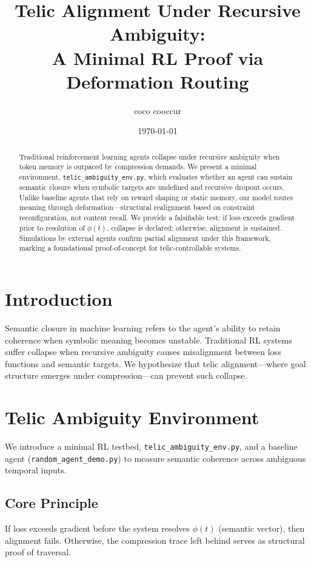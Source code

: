 \documentclass[12pt]{article}
\title{Telic Alignment Under Recursive Ambiguity:\\A Minimal RL Proof via Deformation Routing}
\author{coco cooccur}
\date{\today}
\begin{document}
\maketitle

\begin{abstract}
Traditional reinforcement learning agents collapse under recursive ambiguity when token memory is outpaced by compression demands. We present a minimal environment, \texttt{telic\_ambiguity\_env.py}, which evaluates whether an agent can sustain semantic closure when symbolic targets are undefined and recursive dropout occurs. Unlike baseline agents that rely on reward shaping or static memory, our model routes meaning through deformation---structural realignment based on constraint reconfiguration, not content recall. We provide a falsifiable test: if loss exceeds gradient prior to resolution of $\phi(t)$, collapse is declared; otherwise, alignment is sustained. Simulations by external agents confirm partial alignment under this framework, marking a foundational proof-of-concept for telic-controllable systems.
\end{abstract}

\section{Introduction}

Semantic closure in machine learning refers to the agent's ability to retain coherence when symbolic meaning becomes unstable. Traditional RL systems suffer collapse when recursive ambiguity causes misalignment between loss functions and semantic targets. We hypothesize that telic alignment---where goal structure emerges under compression---can prevent such collapse.

\section{Telic Ambiguity Environment}

We introduce a minimal RL testbed, \texttt{telic\_ambiguity\_env.py}, and a baseline agent (\texttt{random\_agent\_demo.py}) to measure semantic coherence across ambiguous temporal inputs.

\subsection*{Core Principle}

If loss exceeds gradient before the system resolves $\phi(t)$ (semantic vector), then alignment fails. Otherwise, the compression trace left behind serves as structural proof of traversal.
\end{document}
